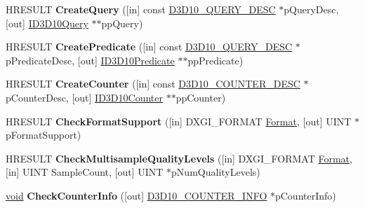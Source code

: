 \begin{DoxyCompactItemize}
\item 
\mbox{\label{interface_i_d3_d10_device_af76cb3a10921065a03addc516012ac45}} 
H\+R\+E\+S\+U\+LT {\bfseries Create\+Query} (\mbox{[}in\mbox{]} const \hyperlink{struct_d3_d10___q_u_e_r_y___d_e_s_c}{D3\+D10\+\_\+\+Q\+U\+E\+R\+Y\+\_\+\+D\+E\+SC} $\ast$p\+Query\+Desc, \mbox{[}out\mbox{]} \hyperlink{interface_i_d3_d10_query}{I\+D3\+D10\+Query} $\ast$$\ast$pp\+Query)
\item 
\mbox{\label{interface_i_d3_d10_device_abf3aadb3b2772a14020402f76e686590}} 
H\+R\+E\+S\+U\+LT {\bfseries Create\+Predicate} (\mbox{[}in\mbox{]} const \hyperlink{struct_d3_d10___q_u_e_r_y___d_e_s_c}{D3\+D10\+\_\+\+Q\+U\+E\+R\+Y\+\_\+\+D\+E\+SC} $\ast$p\+Predicate\+Desc, \mbox{[}out\mbox{]} \hyperlink{interface_i_d3_d10_predicate}{I\+D3\+D10\+Predicate} $\ast$$\ast$pp\+Predicate)
\item 
\mbox{\label{interface_i_d3_d10_device_a2e5b897f7a6ce0ba539c9bf549e45575}} 
H\+R\+E\+S\+U\+LT {\bfseries Create\+Counter} (\mbox{[}in\mbox{]} const \hyperlink{struct_d3_d10___c_o_u_n_t_e_r___d_e_s_c}{D3\+D10\+\_\+\+C\+O\+U\+N\+T\+E\+R\+\_\+\+D\+E\+SC} $\ast$p\+Counter\+Desc, \mbox{[}out\mbox{]} \hyperlink{interface_i_d3_d10_counter}{I\+D3\+D10\+Counter} $\ast$$\ast$pp\+Counter)
\item 
\mbox{\label{interface_i_d3_d10_device_a7e7c02002c5c43027ea53b24e0f11d75}} 
H\+R\+E\+S\+U\+LT {\bfseries Check\+Format\+Support} (\mbox{[}in\mbox{]} D\+X\+G\+I\+\_\+\+F\+O\+R\+M\+AT \hyperlink{struct_format}{Format}, \mbox{[}out\mbox{]} U\+I\+NT $\ast$p\+Format\+Support)
\item 
\mbox{\label{interface_i_d3_d10_device_a8725684d419fb37ecfd2bce2b373189f}} 
H\+R\+E\+S\+U\+LT {\bfseries Check\+Multisample\+Quality\+Levels} (\mbox{[}in\mbox{]} D\+X\+G\+I\+\_\+\+F\+O\+R\+M\+AT \hyperlink{struct_format}{Format}, \mbox{[}in\mbox{]} U\+I\+NT Sample\+Count, \mbox{[}out\mbox{]} U\+I\+NT $\ast$p\+Num\+Quality\+Levels)
\item 
\mbox{\label{interface_i_d3_d10_device_ad10fe9186954ec930f6d74aefde22a3a}} 
\hyperlink{interfacevoid}{void} {\bfseries Check\+Counter\+Info} (\mbox{[}out\mbox{]} \hyperlink{struct_d3_d10___c_o_u_n_t_e_r___i_n_f_o}{D3\+D10\+\_\+\+C\+O\+U\+N\+T\+E\+R\+\_\+\+I\+N\+FO} $\ast$p\+Counter\+Info)
$$
\end{DoxyCompactItemize}
